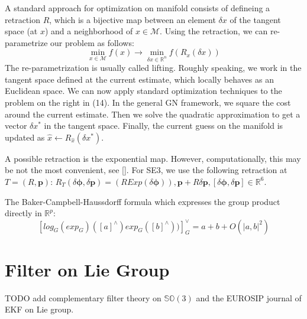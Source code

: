 \documentclass[a4paper,12pt]{report}
\begin{document}
A standard approach for optimization on manifold consists of defineing a retraction $R$, which is a bijective map between an element $\delta x$ of the tangent space (at $x$) and a neighborhood of $x \in \mathcal{M}$. Using the retraction, we can re-parametrize our problem as follows:
\begin{equation}
{\operatorname*{min}_{x \in \mathcal{M}} {f(x)}} \rightarrow {\operatorname*{min}_{\delta x \in \mathbb{R}^n} {f(R_x(\delta x))}}
\end{equation}
The re-parametrization is usually called lifting. Roughly speaking, we work in the tangent space defined at the current estimate, which locally behaves as an Euclidean space. We can now apply standard optimization techniques to the problem on the right in (14). In the general GN framework, we square the cost around the current estimate. Then we solve the quadratic approximation to get a vector $\delta x^*$ in the tangent space. Finally, the current guess on the manifold is updated as $\hat{x} \leftarrow R_{\hat{x}}(\delta x^*)$. 

A possible retraction is the exponential map. However, computationally, this may be not the most convenient, see [].
For SE3, we use the following retraction at $T=(R,\bm{p})$:
$R_T(\delta \bm{\phi}, \delta \bm{p})=(R Exp(\delta \bm{\phi})), \bm{p}+R\delta \bm{p}, [\delta \bm{\phi}, \delta \bm{p}]\in \mathbb{R}^6$.

The Baker-Campbell-Haussdorff formula which expresses the group product directly in $\mathbb{R}^p$:
$$
[log_G{(exp_G)([a]^\land)exp_G([b]^\land))}]_G^\vee = a + b + O(|a,b|^2)
$$

\section{Filter on Lie Group}
TODO add complementary filter theory on $\mathbb{SO}(3)$ and the EUROSIP journal of EKF on Lie group.
\end{document}
